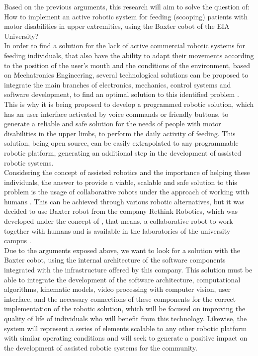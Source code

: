 \documentclass[11pt]{report} %
\begin{document}
Based on the previous arguments, this research will aim to solve the question of:
How to implement an active robotic system for feeding (scooping) patients with motor disabilities in upper extremities, using the Baxter cobot of the EIA University?\\

In order to find a solution for the lack of active commercial robotic systems for feeding individuals, that also have the ability to adapt their movements according to the position of the user's mouth and the conditions of the environment, based on Mechatronics Engineering, several technological solutions can be proposed to integrate the main branches of electronics, mechanics, control systems and software development, to find an optimal solution to this identified problem \citep{cite_university_eia_general}.\\

This is why it is being proposed to develop a programmed robotic solution, which has an user interface activated by voice commands or friendly buttons, to generate a reliable and safe solution for the needs of people with motor disabilities in the upper limbs, to perform the daily activity of feeding. This solution, being open source, can be easily extrapolated to any programmable robotic platform, generating an additional step in the development of assisted robotic systems.\\

Considering the concept of assisted robotics and the importance of helping these individuals, the answer to provide a viable, scalable and safe solution to this problem is the usage of collaborative robots under the approach of working with humans  \citep{cite_rethink_robotics_baxter_factory_worker}. This can be achieved through various robotic alternatives, but it was decided to use Baxter robot from the company Rethink Robotics, which was developed under the concept of , that means, a collaborative robot to work together with humans and is available in the laboratories of the university campus \citep{cite_university_eia_general}.\\

Due to the arguments exposed above, we want to look for a solution with the Baxter cobot, using the internal architecture of the software components integrated with the infrastructure offered by this company. This solution must be able to integrate the development of the software architecture, computational algorithms, kinematic models, video processing with computer vision, user interface,  and the necessary connections of these components for the correct implementation of the robotic solution, which will be focused on improving the quality of life of individuals who will benefit from this technology. Likewise, the system will represent a series of elements scalable to any other robotic platform with similar operating conditions and will seek to generate a positive impact on the development of assisted robotic systems for the community.\\
\end{document}
